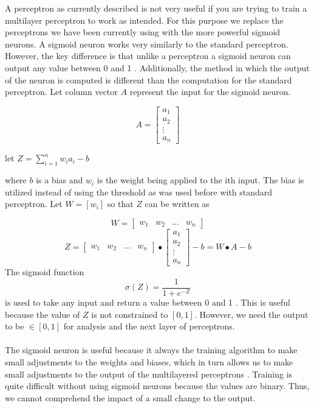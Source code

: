 A perceptron as currently described is not very useful if you are trying to train a multilayer perceptron to work as intended. For this purpose we replace the perceptrons we have been currently using with the more powerful sigmoid neurons. A sigmoid neuron works very similarly to the standard perceptron. However, the key difference is that unlike a perceptron a sigmoid neuron can output any value between 0 and 1 \cite{book}. Additionally, the method in which the output of the neuron is computed is different than the computation for the standard perceptron. Let column vector $A$ represent the input for the sigmoid neuron.

$$
	A = 
	\begin{bmatrix}
		a_1 \\
		a_2 \\
		\vdots \\
		a_n
	\end{bmatrix}
$$

\begin{center}
	let $Z = \sum_{i=1}^{n} w_ia_i - b$
\end{center}
where $b$ is a bias and $w_i$ is the weight being applied to the ith input. The bias is utilized instead of using the threshold as was used before with standard perceptron. Let $W=[w_i]$ so that $Z$ can be written as

$$	W=
	 \begin{bmatrix}
		w_1 & w_2 & \dots & w_n
	\end{bmatrix}
$$
$$	
	Z = \begin{bmatrix}
		w_1 & w_2 & \dots & w_n
	\end{bmatrix}	
	\bullet
	\begin{bmatrix}
		a_1 \\ a_2 \\ \vdots \\ a_n	
	\end{bmatrix} - b
	 = W \bullet A - b
$$
The sigmoid function $$\sigma(Z) = \frac{1}{1+e^{-Z}}$$ is used to take any input and return a value between 0 and 1 \cite{book}. This is useful because the value of $Z$ is not constrained to $[0, 1]$. However, we need the output to be $\in [0, 1]$ for analysis and the next layer of perceptrons. \\ \\
The sigmoid neuron is useful because it always the training algorithm to make small adjustments to the weights and biases, which in turn allows us to make small adjustments to the output of the multilayered perceptrons \cite{book}. Training is quite difficult without using sigmoid neurons because the values are binary. Thus, we cannot comprehend the impact of a small change to the output. 

